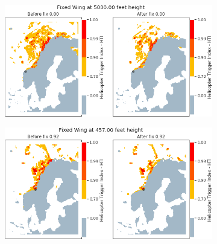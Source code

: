 \begin{figure}[H]
    \begin{subfigure}{0.45\textwidth}
    \centering
    \includegraphics[width=\textwidth]{Figures/05.png}
    \caption{}
    \label{fig:HTI05}
    \end{subfigure}
    \hfill
    \begin{subfigure}{0.45\textwidth}
    \centering
    \includegraphics[width=\textwidth]{Figures/06.png}
    \caption{}
    \label{fig:HTI06}
    \end{subfigure}
    

\end{figure}
